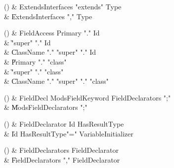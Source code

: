 \begin{bbgrammarappendix}

() & ExtendsInterfaces \label{prod:ExtendsInterfaces}  \: \xcd"extends" Type  \\

 &    \| ExtendsInterfaces \xcd"," Type \\

\end{bbgrammarappendix}

\begin{bbgrammarappendix}

() & FieldAccess \label{prod:FieldAccess}  \: Primary \xcd"." Id  \\

 &    \| \xcd"super" \xcd"." Id \\
 &    \| ClassName \xcd"." \xcd"super"  \xcd"." Id \\
 &    \| Primary \xcd"." \xcd"class"  \\
 &    \| \xcd"super" \xcd"." \xcd"class"  \\
 &    \| ClassName \xcd"." \xcd"super"  \xcd"." \xcd"class"  \\

\end{bbgrammarappendix}

\begin{bbgrammarappendix}

() & FieldDecl \label{prod:FieldDecl}  \: Mods\opt FieldKeyword FieldDeclarators \xcd";"  \\

 &    \| Mods\opt FieldDeclarators \xcd";" \\

\end{bbgrammarappendix}

\begin{bbgrammarappendix}

() & FieldDeclarator \label{prod:FieldDeclarator}  \: Id HasResultType  \\

 &    \| Id HasResultType\opt \xcd"=" VariableInitializer \\

\end{bbgrammarappendix}

\begin{bbgrammarappendix}

() & FieldDeclarators \label{prod:FieldDeclarators}  \: FieldDeclarator  \\

 &    \| FieldDeclarators \xcd"," FieldDeclarator \\

\end{bbgrammarappendix}


